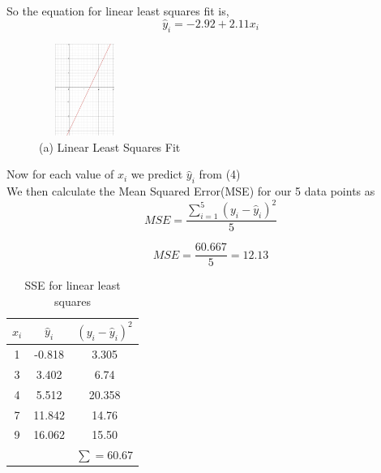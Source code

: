 \documentclass{scrartcl}
\begin{document}
So the equation for linear least squares fit is,\\
\begin{equation}
\hat y_i=-2.92+2.11x_i  
\end{equation}

\begin{figure}[ht]
    \centering
    \includegraphics[width=3cm, height=3cm]{Linearfit.png}
    \caption{(a) Linear Least Squares Fit}
    \label{fig:lf}
\end{figure}

Now for each value of $x_i$ we predict $\hat y_i$ from (4)\\

We then calculate the Mean Squared Error(MSE) for our 5 data points as\\

$$MSE =\frac{\sum_{i=1}^{5}(y_i-\hat y_i)^2}{5}$$

\begin{equation}
MSE =\frac{60.667}{5}=12.13    
\end{equation}



\begin{table}[ht]
    \centering
    \begin{tabular}{|c|c|c|}
    \hline
        $x_i$ & $\hat y_i$ & $(y_i-\hat y_i)^2$ \\
    \hline \hline
        1 & -0.818 & 3.305\\
    \hline
        3 & 3.402 & 6.74\\
    \hline
        4 & 5.512 & 20.358\\
    \hline
        7 & 11.842 & 14.76\\
    \hline
        9 & 16.062 & 15.50\\
    \hline
        &  & $\sum=60.67$\\
    \hline
    \end{tabular}
    \caption{SSE for linear least squares}
    \label{tab:SSE1}
\end{table}
\end{document}
